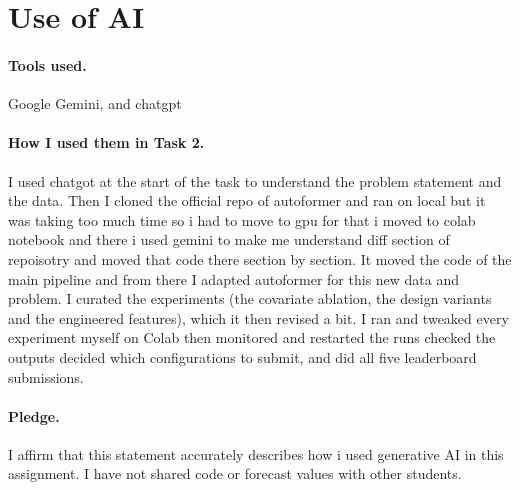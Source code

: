 \documentclass[a4, 12pt]{article}
\begin{document}
\section{Use of AI}

\paragraph{Tools used.} Google Gemini, and chatgpt

\paragraph{How I used them in Task 2.}
I used chatgot at the start of the task to understand the problem statement and the data. Then I cloned the official repo of autoformer and ran on local but it was taking too  much time so i had to move to gpu for that i moved to colab notebook and there i used gemini to make me understand diff section of repoisotry and moved that code there section by section. It moved the code of the main pipeline and from there I  adapted autoformer for this new data and problem. I curated the experiments (the covariate ablation, the design variants and the engineered features), which it then revised a bit.
I ran and tweaked every experiment myself on Colab then monitored and restarted the runs checked the outputs decided which configurations to submit, and did all five leaderboard submissions.


\paragraph{Pledge.} I affirm that this statement accurately describes how i used generative AI in this assignment. I have not shared code or forecast values with other students.
\end{document}
